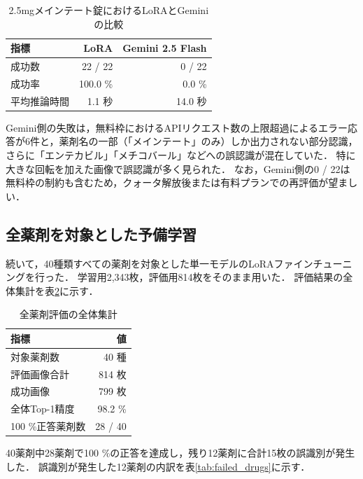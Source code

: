 \documentclass{ltjsarticle}
\begin{document}
\begin{table}[h]
\centering
\caption{2.5mgメインテート錠におけるLoRAとGeminiの比較}
\label{tab:vs_gemini}
\begin{tabular}{lrr}
\hline
指標 & LoRA & Gemini 2.5 Flash \\
\hline
成功数 & 22 / 22 & 0 / 22 \\
成功率 & 100.0 \% & 0.0 \% \\
平均推論時間 & 1.1 秒 & 14.0 秒 \\
\hline
\end{tabular}
\end{table}

Gemini側の失敗は，無料枠におけるAPIリクエスト数の上限超過によるエラー応答が6件と，薬剤名の一部（「メインテート」のみ）しか出力されない部分認識，さらに「エンテカビル」「メチコバール」などへの誤認識が混在していた．
特に大きな回転を加えた画像で誤認識が多く見られた．
なお，Gemini側の0 / 22は無料枠の制約も含むため，クォータ解放後または有料プランでの再評価が望ましい．

\subsection{全薬剤を対象とした予備学習}

続いて，40種類すべての薬剤を対象とした単一モデルのLoRAファインチューニングを行った．
学習用2,343枚，評価用814枚をそのまま用いた．
評価結果の全体集計を表\ref{tab:all_drugs_summary}に示す．

\begin{table}[h]
\centering
\caption{全薬剤評価の全体集計}
\label{tab:all_drugs_summary}
\begin{tabular}{lr}
\hline
指標 & 値 \\
\hline
対象薬剤数 & 40 種 \\
評価画像合計 & 814 枚 \\
成功画像 & 799 枚 \\
全体Top-1精度 & 98.2 \% \\
100 \%正答薬剤数 & 28 / 40 \\
\hline
\end{tabular}
\end{table}

40薬剤中28薬剤で100 \%の正答を達成し，残り12薬剤に合計15枚の誤識別が発生した．
誤識別が発生した12薬剤の内訳を表\ref{tab:failed_drugs}に示す．
\end{document}
